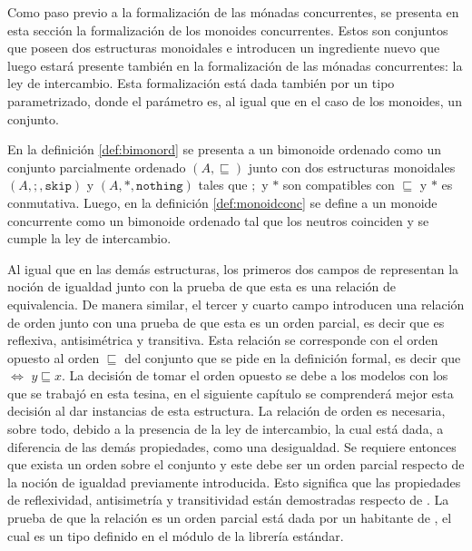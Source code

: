 Como paso previo a la formalización de las mónadas concurrentes, se presenta en esta sección la formalización de los monoides concurrentes. Estos son conjuntos que poseen dos estructuras monoidales e introducen un ingrediente nuevo que luego estará presente también en la formalización de las mónadas concurrentes: la ley de intercambio. Esta formalización está dada también por un tipo  parametrizado, donde el parámetro es, al igual que en el caso de los monoides, un conjunto. 


En la definición \ref{def:bimonord} se presenta a un bimonoide ordenado como un conjunto parcialmente ordenado $(A,\sqsubseteq)$ junto con dos estructuras monoidales $(A,;,\mathtt{skip})$ y $(A,*,\mathtt{nothing})$ tales que $;$ y $*$ son compatibles con $\sqsubseteq$ y $*$ es conmutativa. Luego, en la definición \ref{def:monoidconc} se define a un monoide concurrente como un bimonoide ordenado tal que los neutros coinciden y se cumple la ley de intercambio.

Al igual que en las demás estructuras, los primeros dos campos de  representan la noción de igualdad junto con la prueba de que esta es una relación de equivalencia. De manera similar, el tercer y cuarto campo introducen una relación de orden junto con una prueba de que esta es un orden parcial, es decir que es reflexiva, antisimétrica y transitiva. Esta relación se corresponde con el orden opuesto al orden $\sqsubseteq$ del conjunto que se pide en la definición formal, es decir que    $\Leftrightarrow$ $y \sqsubseteq x$. La decisión de tomar el orden opuesto se debe a los modelos con los que se trabajó en esta tesina, en el siguiente capítulo se comprenderá mejor esta decisión al dar instancias de esta estructura. La relación de orden es necesaria, sobre todo, debido a la presencia de la ley de intercambio, la cual está dada, a diferencia de las demás propiedades, como una desigualdad. Se requiere entonces que exista un orden sobre el conjunto  y este debe ser un orden parcial respecto de la noción de igualdad previamente introducida. Esto significa que las propiedades de reflexividad, antisimetría y transitividad están demostradas respecto de . La prueba  de que la relación  es un orden parcial está dada por un habitante de , el cual es un tipo  definido en el módulo \href{https://agda.github.io/agda-stdlib/Relation.Binary.Structures.html}{} de la librería estándar.

